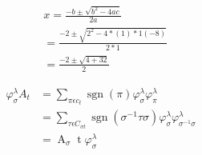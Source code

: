\documentclass{article}
\begin{document}
	\begin{minipage}{0.5\textwidth}
		\begin{align*}
			&x=\frac{-b\pm\sqrt{b^{2}-4ac}}{2a}\\
			&=\frac{-2\pm\sqrt{2^2-4*(1)*1(-8)}}{2*1}\\
			&=\frac{-2\pm\sqrt{4+32}}{2}
		\end{align*}
	\end{minipage}
	\hfill
   \begin{minipage}{0.5\textwidth}
     \begin{align*}
		 \varphi_\sigma^{\lambda}A_t &=\sum_{\pi\epsilon c_{t}}  \operatorname{sgn}(\pi)\varphi_\sigma^{\lambda}\varphi_\pi^{\lambda}\\
		 &= \sum_{\tau\epsilon C_{\sigma t}} \operatorname{sgn}(\sigma^{-1}\tau\sigma)\varphi_\sigma^{\lambda}\varphi_{\sigma^{-1}{\sigma}}^{\lambda}\\
		 &=\operatorname{A}_\sigma\operatorname{t}\varphi_\sigma^{\lambda}
	 \end{align*}
  \end{minipage}
\end{document}
